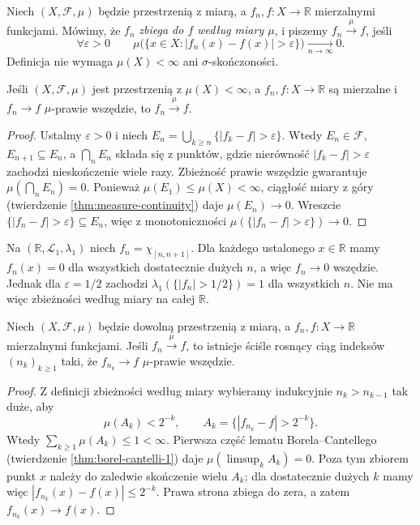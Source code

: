 \begin{definicja}
\label{def:convergence-measure}
Niech $(X,\mathcal F,\mu)$ będzie przestrzenią z miarą,
a $f_n,f:X\to\mathbb R$ mierzalnymi funkcjami.
Mówimy, że $f_n$ \emph{zbiega do $f$ według miary $\mu$},
i piszemy $f_n\xrightarrow{\mu}f$, jeśli
\[
\forall\varepsilon>0\qquad
\mu\bigl(\{x\in X:|f_n(x)-f(x)|>\varepsilon\}\bigr)
\xrightarrow[n\to\infty]{}0.
\]
Definicja nie wymaga $\mu(X)<\infty$ ani
$\sigma$-skończoności.
\end{definicja}

\begin{twierdzenie}
\label{thm:ae-to-measure-finite}
Jeśli $(X,\mathcal F,\mu)$ jest przestrzenią
z $\mu(X)<\infty$, a $f_n,f:X\to\mathbb R$ są
mierzalne i $f_n\to f$ $\mu$-prawie wszędzie,
to $f_n\xrightarrow{\mu}f$.
\end{twierdzenie}
\begin{proof}
Ustalmy $\varepsilon>0$ i niech
$E_n=\bigcup_{k\ge n}\{|f_k-f|>\varepsilon\}$.
Wtedy $E_n\in\mathcal F$, $E_{n+1}\subseteq E_n$,
a $\bigcap_nE_n$ składa się z punktów, gdzie
nierówność $|f_k-f|>\varepsilon$ zachodzi
nieskończenie wiele razy. Zbieżność prawie wszędzie
gwarantuje $\mu(\bigcap_nE_n)=0$.
Ponieważ $\mu(E_1)\le\mu(X)<\infty$,
ciągłość miary z góry (twierdzenie
\ref{thm:measure-continuity}) daje $\mu(E_n)\to0$.
Wreszcie $\{|f_n-f|>\varepsilon\}\subseteq E_n$,
więc z monotoniczności $\mu(\{|f_n-f|>\varepsilon\})\to0$.
\end{proof}

\begin{przyklad}
\label{ex:aenotmeasure}
Na $(\mathbb R,\mathcal L_1,\lambda_1)$ niech
$f_n=\chi_{[n,n+1]}$. Dla każdego ustalonego
$x\in\mathbb R$ mamy $f_n(x)=0$ dla wszystkich
dostatecznie dużych $n$, a więc $f_n\to0$ wszędzie.
Jednak dla $\varepsilon=1/2$ zachodzi
$\lambda_1(\{|f_n|>1/2\})=1$ dla wszystkich $n$.
Nie ma więc zbieżności według miary na całej $\mathbb R$.
\end{przyklad}

\begin{twierdzenie}
\label{thm:measure-subsequence}
Niech $(X,\mathcal F,\mu)$ będzie dowolną przestrzenią
z miarą, a $f_n,f:X\to\mathbb R$ mierzalnymi funkcjami.
Jeśli $f_n\xrightarrow{\mu}f$, to istnieje ściśle
rosnący ciąg indeksów $(n_k)_{k\ge1}$ taki, że
$f_{n_k}\to f$ $\mu$-prawie wszędzie.
\end{twierdzenie}
\begin{proof}
Z definicji zbieżności według miary wybieramy
indukcyjnie $n_k>n_{k-1}$ tak duże, aby
\[
\mu(A_k)<2^{-k},\qquad
A_k=\{|f_{n_k}-f|>2^{-k}\}.
\]
Wtedy $\sum_{k\ge1}\mu(A_k)\le1<\infty$.
Pierwsza część lematu Borela--Cantellego
(twierdzenie \ref{thm:borel-cantelli-1})
daje $\mu(\limsup_k A_k)=0$.
Poza tym zbiorem punkt $x$ należy do zaledwie
skończenie wielu $A_k$; dla dostatecznie dużych $k$
mamy więc $|f_{n_k}(x)-f(x)|\le2^{-k}$.
Prawa strona zbiega do zera, a zatem
$f_{n_k}(x)\to f(x)$.
\end{proof}

